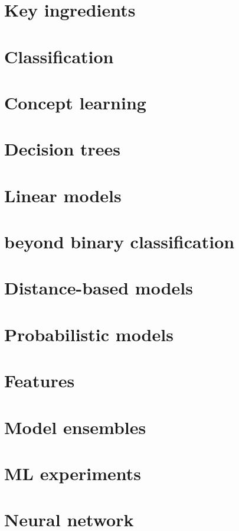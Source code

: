 \documentclass[8pt]{extarticle} %
\begin{document}
\tiny
\raggedright
\begin{multicols}{3}
\section{Key ingredients}

\section{Classification}

\section{Concept learning}

\section{Decision trees}

\section{Linear models}

\section{beyond binary classification}

\section{Distance-based models}

\section{Probabilistic models}

\section{Features}

\section{Model ensembles}

\section{ML experiments}

\section{Neural network}

\end{multicols}
\end{document}
